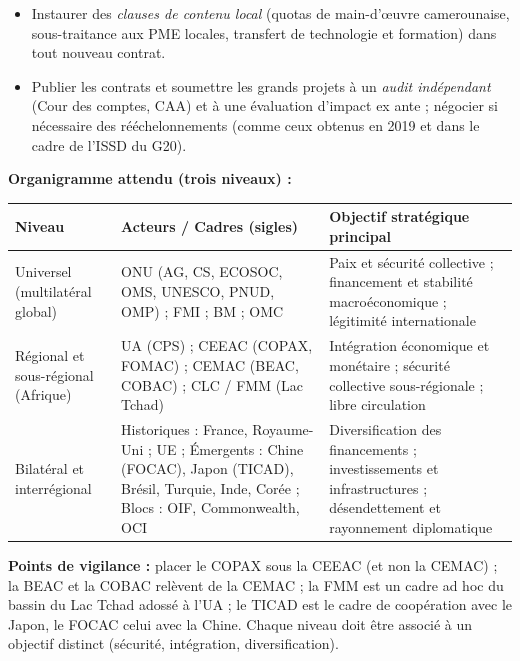 \documentclass[11pt]{article}
\begin{document}
\begin{corrige}
\begin{enumerate}
    \begin{itemize}
        \item Instaurer des \emph{clauses de contenu local} (quotas de main-d'œuvre camerounaise, sous-traitance aux PME locales, transfert de technologie et formation) dans tout nouveau contrat.
        \item Publier les contrats et soumettre les grands projets à un \emph{audit indépendant} (Cour des comptes, CAA) et à une évaluation d'impact ex ante ; négocier si nécessaire des rééchelonnements (comme ceux obtenus en 2019 et dans le cadre de l'ISSD du G20).
    \end{itemize}
\end{enumerate}
\end{corrige}

\begin{corrige}
\textbf{Organigramme attendu (trois niveaux) :}
\begin{center}
\begin{tabularx}{\linewidth}{|l|X|X|}\hline
\rowcolor{popblueL}
\textbf{Niveau} & \textbf{Acteurs / Cadres (sigles)} & \textbf{Objectif stratégique principal} \\ \hline
Universel (multilatéral global) & ONU (AG, CS, ECOSOC, OMS, UNESCO, PNUD, OMP) ; FMI ; BM ; OMC & Paix et sécurité collective ; financement et stabilité macroéconomique ; légitimité internationale \\ \hline
Régional et sous-régional (Afrique) & UA (CPS) ; CEEAC (COPAX, FOMAC) ; CEMAC (BEAC, COBAC) ; CLC / FMM (Lac Tchad) & Intégration économique et monétaire ; sécurité collective sous-régionale ; libre circulation \\ \hline
Bilatéral et interrégional & Historiques : France, Royaume-Uni ; UE ; Émergents : Chine (FOCAC), Japon (TICAD), Brésil, Turquie, Inde, Corée ; Blocs : OIF, Commonwealth, OCI & Diversification des financements ; investissements et infrastructures ; désendettement et rayonnement diplomatique \\ \hline
\end{tabularx}
\end{center}
\textbf{Points de vigilance :} placer le COPAX sous la CEEAC (et non la CEMAC) ; la BEAC et la COBAC relèvent de la CEMAC ; la FMM est un cadre ad hoc du bassin du Lac Tchad adossé à l'UA ; le TICAD est le cadre de coopération avec le Japon, le FOCAC celui avec la Chine. Chaque niveau doit être associé à un objectif distinct (sécurité, intégration, diversification).
\end{corrige}
\end{document}
